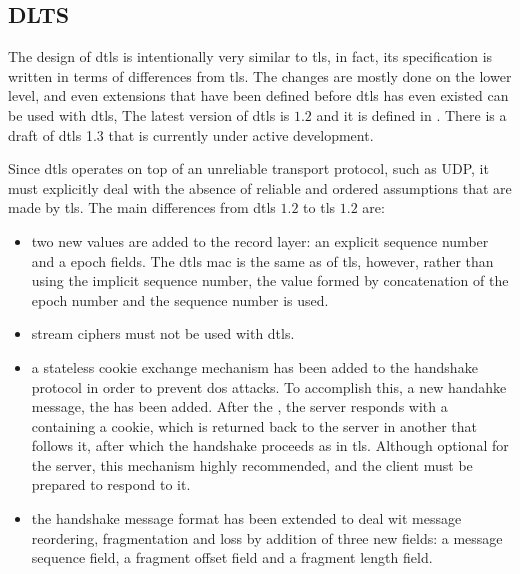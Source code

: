 \documentclass{llncs}
\begin{document}
%
\subsection{DLTS}

The design of \gls{dtls} is intentionally very similar to \gls{tls}, in fact, its specification is written
in terms of differences from \gls{tls}. The changes are mostly done on the lower level,
and even extensions that have been defined before \gls{dtls} has even existed can be
used with \gls{dtls}, The latest version of \gls{dtls} is $1.2$ and it is defined
in \cite{RFC6347}. There is a draft of \gls{dtls} 1.3
\cite{I-D.ietf-tls-dtls13} that is currently under active development.

Since \gls{dtls} operates on top of an unreliable transport protocol, such as
UDP, it must explicitly deal with the absence of reliable and ordered assumptions
that are made by \gls{tls}. The main differences from \gls{dtls} $1.2$ to \gls{tls} $1.2$ are:

\begin{itemize}
  \item two new values are added to the record layer: an explicit  sequence
  number and a  epoch fields. The \gls{dtls} \gls{mac} is the same as of \gls{tls},
  however, rather than using the implicit sequence number, the  value
  formed by concatenation of the epoch number and the sequence number is used.

  \item stream ciphers must not be used with \gls{dtls}.

  \item a stateless cookie exchange mechanism has been added to the handshake protocol
  in order to prevent \gls{dos} attacks. To accomplish this, a new handahke
  message, the  has been added. After
  the , the server responds with a 
  containing a cookie, which is returned back to the server in another
   that follows it, after which the handshake proceeds as in \gls{tls}.
  Although optional for the server, this mechanism highly recommended, and the
  client must be prepared to respond to it.

  \item the handshake message format has been extended to deal wit message reordering,
  fragmentation and loss by addition of three new fields: a message sequence field,
  a fragment offset field and a fragment length field.
\end{itemize}
\end{document}
